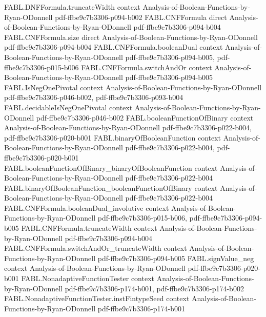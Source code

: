 \begin{theorem}
\proofstep
  {FABL.DNFFormula.truncateWidth}
  {context}
  {Analysis-of-Boolean-Functions-by-Ryan-ODonnell}
  {pdf-ffbe9c7b3306-p094-b002}
\proofstep
  {FABL.CNFFormula}
  {direct}
  {Analysis-of-Boolean-Functions-by-Ryan-ODonnell}
  {pdf-ffbe9c7b3306-p094-b004}
\proofstep
  {FABL.CNFFormula.size}
  {direct}
  {Analysis-of-Boolean-Functions-by-Ryan-ODonnell}
  {pdf-ffbe9c7b3306-p094-b004}
\proofstep
  {FABL.CNFFormula.booleanDual}
  {context}
  {Analysis-of-Boolean-Functions-by-Ryan-ODonnell}
  {pdf-ffbe9c7b3306-p094-b005,
    pdf-ffbe9c7b3306-p015-b006}
\proofstep
  {FABL.CNFFormula.switchAndOr}
  {context}
  {Analysis-of-Boolean-Functions-by-Ryan-ODonnell}
  {pdf-ffbe9c7b3306-p094-b005}
\proofstep
  {FABL.IsNegOnePivotal}
  {context}
  {Analysis-of-Boolean-Functions-by-Ryan-ODonnell}
  {pdf-ffbe9c7b3306-p046-b002,
    pdf-ffbe9c7b3306-p093-b004}
\proofstep
  {FABL.decidableIsNegOnePivotal}
  {context}
  {Analysis-of-Boolean-Functions-by-Ryan-ODonnell}
  {pdf-ffbe9c7b3306-p046-b002}
\proofstep
  {FABL.booleanFunctionOfBinary}
  {context}
  {Analysis-of-Boolean-Functions-by-Ryan-ODonnell}
  {pdf-ffbe9c7b3306-p022-b004,
    pdf-ffbe9c7b3306-p020-b001}
\proofstep
  {FABL.binaryOfBooleanFunction}
  {context}
  {Analysis-of-Boolean-Functions-by-Ryan-ODonnell}
  {pdf-ffbe9c7b3306-p022-b004,
    pdf-ffbe9c7b3306-p020-b001}
\proofstep
  {FABL.booleanFunctionOfBinary_binaryOfBooleanFunction}
  {context}
  {Analysis-of-Boolean-Functions-by-Ryan-ODonnell}
  {pdf-ffbe9c7b3306-p022-b004}
\proofstep
  {FABL.binaryOfBooleanFunction_booleanFunctionOfBinary}
  {context}
  {Analysis-of-Boolean-Functions-by-Ryan-ODonnell}
  {pdf-ffbe9c7b3306-p022-b004}
\proofstep
  {FABL.CNFFormula.booleanDual_involutive}
  {context}
  {Analysis-of-Boolean-Functions-by-Ryan-ODonnell}
  {pdf-ffbe9c7b3306-p015-b006,
    pdf-ffbe9c7b3306-p094-b005}
\proofstep
  {FABL.CNFFormula.truncateWidth}
  {context}
  {Analysis-of-Boolean-Functions-by-Ryan-ODonnell}
  {pdf-ffbe9c7b3306-p094-b004}
\proofstep
  {FABL.CNFFormula.switchAndOr_truncateWidth}
  {context}
  {Analysis-of-Boolean-Functions-by-Ryan-ODonnell}
  {pdf-ffbe9c7b3306-p094-b005}
\proofstep
  {FABL.signValue_neg}
  {context}
  {Analysis-of-Boolean-Functions-by-Ryan-ODonnell}
  {pdf-ffbe9c7b3306-p020-b001}
\proofstep
  {FABL.NonadaptiveFunctionTester}
  {context}
  {Analysis-of-Boolean-Functions-by-Ryan-ODonnell}
  {pdf-ffbe9c7b3306-p174-b001,
    pdf-ffbe9c7b3306-p174-b002}
\proofstep
  {FABL.NonadaptiveFunctionTester.instFintypeSeed}
  {context}
  {Analysis-of-Boolean-Functions-by-Ryan-ODonnell}
  {pdf-ffbe9c7b3306-p174-b001}
\proofstep

\end{theorem}

